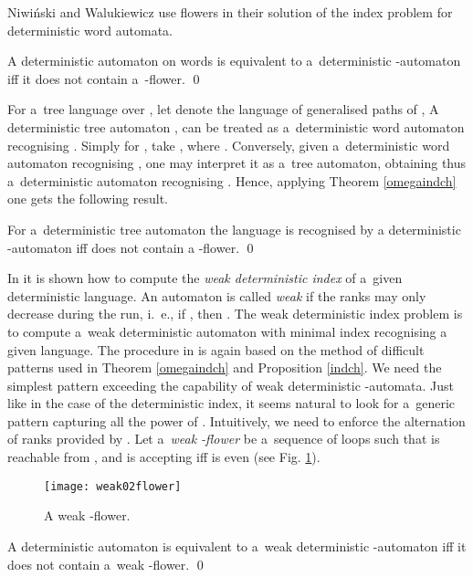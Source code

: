 \documentclass{LMCS}
\begin{document}
Niwi{\'n}ski and Walukiewicz use flowers in their solution of the index problem for deterministic word automata. 

\begin{thm} \label{omegaindch}
A deterministic automaton on words is equivalent to a~deterministic -automaton iff it does not contain a~-flower. \qed
\end{thm}

\noindent For a~tree language  over , let  denote the language of generalised paths of , 
A deterministic tree automaton , can be treated as a~deterministic
word automaton recognising . Simply for , take , where . Conversely, given a~deterministic word automaton recognising , one may interpret it as a~tree automaton, obtaining thus a~deterministic automaton recognising . Hence, applying Theorem \ref{omegaindch} one gets the following result.

\begin{prop} \label{indch}
For a~deterministic tree automaton  the language  is recognised by a deterministic -automaton iff  does not contain a -flower. \qed
\end{prop}

In \cite{split} it is shown how to compute the {\em weak deterministic index} of a~given deterministic language. An automaton is called {\em weak} if the ranks may only decrease during the run, i.~e.,  if , then . The weak deterministic index problem is to compute a~weak deterministic automaton with minimal index recognising a given language. The procedure in \cite{split} is again based on the method of difficult patterns used in Theorem \ref{omegaindch} and Proposition \ref{indch}. We need the simplest pattern exceeding the capability of weak deterministic -automata. Just like in the case of the deterministic index, it seems natural to look for a~generic pattern capturing all the power of  . Intuitively, we need to enforce the alternation of ranks provided by . Let a~{\em weak -flower} \label{weakflowers} be a~sequence of loops  such that  is reachable from , and  is accepting iff  is even (see Fig. \ref{fig:weak02flower}). 

\begin{figure}
\centering
\texttt{[image: weak02flower]}
\caption{A weak -flower.}
\label{fig:weak02flower}
\end{figure}

\begin{prop} \label{windch}
A deterministic automaton  is equivalent to a~weak deterministic -automaton iff it does not contain a~weak -flower. \qed
\end{prop}
\end{document}

